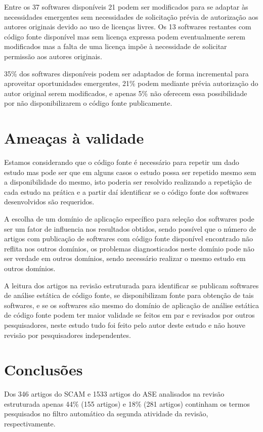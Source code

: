 Entre os 37 softwares disponíveis 21 podem ser modificados para se adaptar às
necessidades emergentes sem necessidades de solicitação prévia de autorização
aos autores originais devido ao uso de licenças livres. Os 13 softwares
restantes com código fonte disponível mas sem licença expressa podem
eventualmente serem modificados mas a falta de uma licença impõe à necessidade
de solicitar permissão aos autores originais.

35\% dos softwares disponíveis podem ser adaptados de forma incremental para
aproveitar oportunidades emergentes, 21\% podem mediante prévia autorização do
autor original serem modificados, e apenas 5\% não oferecem essa possibilidade
por não disponibilizarem o código fonte publicamente.

\section{Ameaças à validade}

Estamos considerando que o código fonte é necessário para repetir um dado
estudo mas pode ser que em alguns casos o estudo possa ser repetido mesmo sem a
disponibilidade do mesmo, isto poderia ser resolvido realizando a repetição
de cada estudo na prática e a partir daí identificar se o código fonte dos
softwares desenvolvidos são requeridos.

A escolha de um domínio de aplicação específico para seleção dos softwares
pode ser um fator de influencia nos resultados obtidos, sendo possível que
o número de artigos com publicação de softwares com código fonte disponível
encontrado não reflita nos outros domínios, os problemas diagnosticados
neste domínio pode não ser verdade em outros domínios, sendo necessário
realizar o mesmo estudo em outros domínios.

A leitura dos artigos na revisão estruturada para identificar se publicam
softwares de análise estática de código fonte, se disponibilizam fonte para
obtenção de tais softwares, e se os softwares são mesmo do domínio de aplicação
de análise estática de código fonte podem ter maior validade se feitos em
par e revisados por outros pesquisadores, neste estudo tudo foi feito pelo
autor deste estudo e não houve revisão por pesquisadores independentes.

\section{Conclusões}

Dos 346 artigos do SCAM e 1533 artigos do ASE analisados na revisão estruturada
apenas 44\% (155 artigos) e 18\% (281 artigos) continham os termos pesquisados
no filtro automático da segunda atividade da revisão, respectivamente.

